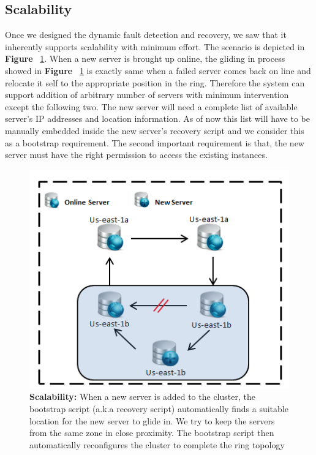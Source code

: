 \documentclass[12pt]{article}
\begin{document}
\subsection{Scalability}
\label{scalability} 
Once we designed the dynamic fault detection and recovery, we saw
that it inherently supports scalability with minimum effort. The scenario is
depicted in \textbf{Figure }~\ref{fig:scalability}. When a new server is brought
up online, the gliding in process showed in \textbf{Figure
}~\ref{fig:scalability} is exactly same when a failed server comes back on line
and relocate it self to the appropriate position in the ring. Therefore the
system can support addition of arbitrary number of servers with minimum
intervention except the following two. The new server will need a complete list
of available server's IP addresses and location information. As of now this list
will have to be manually embedded inside the new server's recovery script and we
consider this as a bootstrap requirement. The second important requirement is
that, the new server must have the right permission to access the existing
instances.  
\begin{figure}[H] 
\centering
\includegraphics[scale=0.8]{Images/figure3.PNG} 
\caption{\textbf{Scalability:}
When a new server is added to the cluster, the bootstrap script (a.k.a recovery
script) automatically finds a suitable location for the new server to glide in.
We try to keep the servers from the same zone in close proximity. The bootstrap
script then automatically reconfigures the cluster to complete the ring topology
} 
\label{fig:scalability} 
\end{figure}
\end{document}
